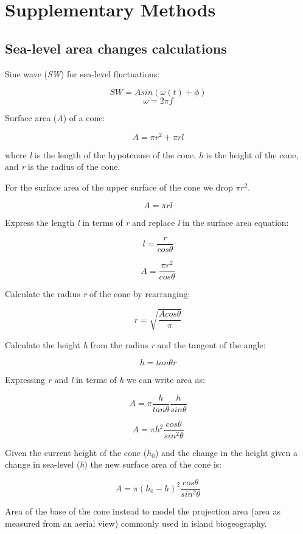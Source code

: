 \section*{Supplementary Methods}
\label{supplementary_methods}

\subsection*{Sea-level area changes calculations}

Sine wave (\textit{SW}) for sea-level fluctuations:


\[ SW = A sin(\omega(t) + \phi) \]    
\[ \omega = 2 \pi f \]

Surface area (\textit{A}) of a cone:

\[ A = \pi r^2 + \pi r l \]

where \textit{l} is the length of the hypotenuse of the cone, \textit{h} is the height of the cone, and \textit{r} is the radius of the cone. 

For the surface area of the upper surface of the cone we drop $\pi r^2$.

\[ A = \pi r l \]

Express the length \textit{l} in terms of \textit{r} and replace \textit{l} in the surface area equation:

\[ l = \frac{r}{cos \theta} \]

\[ A = \frac{\pi r^2}{cos \theta} \]

Calculate the radius \textit{r} of the cone by rearranging: 

\[ r = \sqrt{\frac{A cos \theta}{\pi}} \]

Calculate the height \textit{h} from the radius \textit{r} and the tangent of the angle:

\[ h = tan \theta r \]

Expressing \textit{r} and \textit{l} in terms of \textit{h} we can write area as: 

\[ A = \pi \frac{h}{tan \theta} \frac{h}{sin \theta} \]

\[ A = \pi h^2 \frac{cos \theta}{sin^2 \theta} \]

Given the current height of the cone ($h_0$) and the change in the height given a change in sea-level (\textit{h}) the new surface area of the cone is:

\[ A = \pi (h_0 - h)^2 \frac{cos \theta}{sin^2 \theta} \]

Area of the base of the cone instead to model the projection area (area as measured from an aerial view) commonly used in island biogeography. \\

